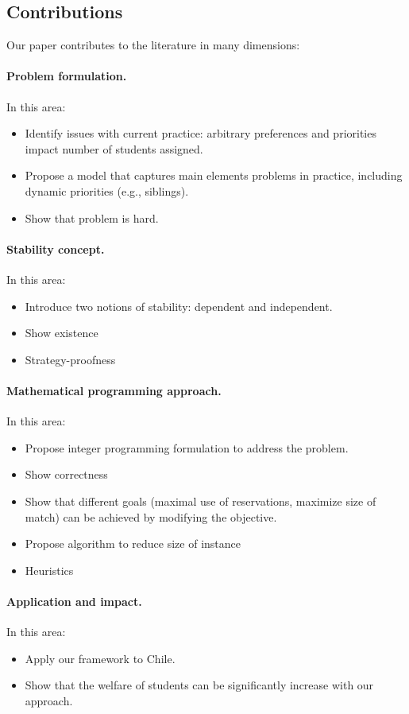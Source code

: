 \subsection{Contributions}
Our paper contributes to the literature in many dimensions:

\paragraph{Problem formulation.} In this area:
\begin{itemize}
  \item Identify issues with current practice: arbitrary preferences and priorities impact number of students assigned.
  \item Propose a model that captures main elements problems in practice, including dynamic priorities (e.g., siblings).
  \item Show that problem is hard.
\end{itemize}

\paragraph{Stability concept.} In this area:
\begin{itemize}
  \item Introduce two notions of stability: dependent and independent.
  \item Show existence
  \item Strategy-proofness
\end{itemize}

\paragraph{Mathematical programming approach.} In this area:
\begin{itemize}
  \item Propose integer programming formulation to address the problem.
  \item Show correctness
  \item Show that different goals (maximal use of reservations, maximize size of match) can be achieved by modifying the objective.
  \item Propose algorithm to reduce size of instance
  \item Heuristics
\end{itemize}

\paragraph{Application and impact.} In this area:
\begin{itemize}
  \item Apply our framework to Chile.
  \item Show that the welfare of students can be significantly increase with our approach.
\end{itemize}

